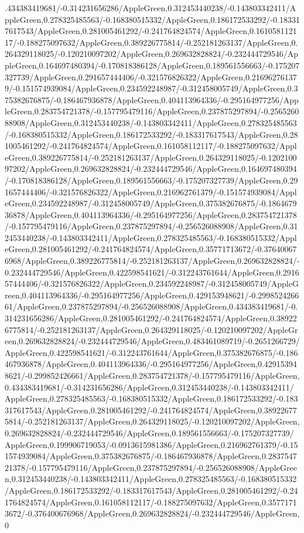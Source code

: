 {\begin{tikzternal}
{.434383419681/-0.314231656286/AppleGreen,0.312453440238/-0.143803342411/AppleGreen,0.278325485563/-0.168380515332/AppleGreen,0.186172533292/-0.183317617543/AppleGreen,0.281005461292/-0.241764824574/AppleGreen,0.161058112117/-0.188275097632/AppleGreen,0.389226775814/-0.252181263137/AppleGreen,0.264329118025/-0.120210097202/AppleGreen,0.269632828824/-0.232444729546/AppleGreen,0.164697480394/-0.170818386128/AppleGreen,0.189561556663/-0.175207327739/AppleGreen,0.291657444406/-0.321576826322/AppleGreen,0.216962761379/-0.151574939084/AppleGreen,0.234592248987/-0.312458005749/AppleGreen,0.375382676875/-0.186467936878/AppleGreen,0.404113964336/-0.295164977256/AppleGreen,0.283754721378/-0.157795479116/AppleGreen,0.237875297894/-0.256526088908/AppleGreen,0.312453440238/-0.143803342411/AppleGreen,0.278325485563/-0.168380515332/AppleGreen,0.186172533292/-0.183317617543/AppleGreen,0.281005461292/-0.241764824574/AppleGreen,0.161058112117/-0.188275097632/AppleGreen,0.389226775814/-0.252181263137/AppleGreen,0.264329118025/-0.120210097202/AppleGreen,0.269632828824/-0.232444729546/AppleGreen,0.164697480394/-0.170818386128/AppleGreen,0.189561556663/-0.175207327739/AppleGreen,0.291657444406/-0.321576826322/AppleGreen,0.216962761379/-0.151574939084/AppleGreen,0.234592248987/-0.312458005749/AppleGreen,0.375382676875/-0.186467936878/AppleGreen,0.404113964336/-0.295164977256/AppleGreen,0.283754721378/-0.157795479116/AppleGreen,0.237875297894/-0.256526088908/AppleGreen,0.312453440238/-0.143803342411/AppleGreen,0.278325485563/-0.168380515332/AppleGreen,0.281005461292/-0.241764824574/AppleGreen,0.35771713672/-0.376400676968/AppleGreen,0.389226775814/-0.252181263137/AppleGreen,0.269632828824/-0.232444729546/AppleGreen,0.422598541621/-0.312243761644/AppleGreen,0.291657444406/-0.321576826322/AppleGreen,0.234592248987/-0.312458005749/AppleGreen,0.404113964336/-0.295164977256/AppleGreen,0.429153948621/-0.299852426661/AppleGreen,0.237875297894/-0.256526088908/AppleGreen,0.434383419681/-0.314231656286/AppleGreen,0.281005461292/-0.241764824574/AppleGreen,0.389226775814/-0.252181263137/AppleGreen,0.264329118025/-0.120210097202/AppleGreen,0.269632828824/-0.232444729546/AppleGreen,0.483461089719/-0.2651266729/AppleGreen,0.422598541621/-0.312243761644/AppleGreen,0.375382676875/-0.186467936878/AppleGreen,0.404113964336/-0.295164977256/AppleGreen,0.429153948621/-0.299852426661/AppleGreen,0.283754721378/-0.157795479116/AppleGreen,0.434383419681/-0.314231656286/AppleGreen,0.312453440238/-0.143803342411/AppleGreen,0.278325485563/-0.168380515332/AppleGreen,0.186172533292/-0.183317617543/AppleGreen,0.281005461292/-0.241764824574/AppleGreen,0.389226775814/-0.252181263137/AppleGreen,0.264329118025/-0.120210097202/AppleGreen,0.269632828824/-0.232444729546/AppleGreen,0.189561556663/-0.175207327739/AppleGreen,0.199906719053/-0.0913615981386/AppleGreen,0.216962761379/-0.151574939084/AppleGreen,0.375382676875/-0.186467936878/AppleGreen,0.283754721378/-0.157795479116/AppleGreen,0.237875297894/-0.256526088908/AppleGreen,0.312453440238/-0.143803342411/AppleGreen,0.278325485563/-0.168380515332/AppleGreen,0.186172533292/-0.183317617543/AppleGreen,0.281005461292/-0.241764824574/AppleGreen,0.161058112117/-0.188275097632/AppleGreen,0.35771713672/-0.376400676968/AppleGreen,0.269632828824/-0.232444729546/AppleGreen,0}
\end{tikzternal}}
